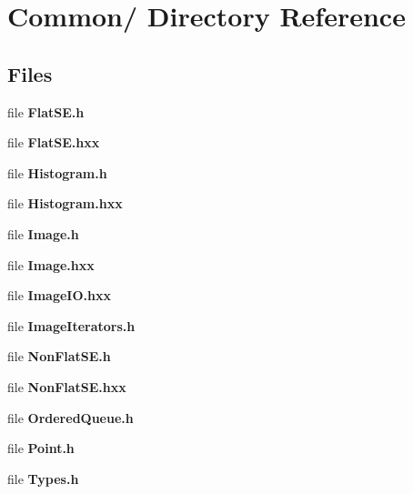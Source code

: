 \section{Common/ Directory Reference}
\label{dir_000001}
\subsection*{Files}
\begin{CompactItemize}
\item 
file {\bf Flat\-SE.h}
\item 
file {\bf Flat\-SE.hxx}
\item 
file {\bf Histogram.h}
\item 
file {\bf Histogram.hxx}
\item 
file {\bf Image.h}
\item 
file {\bf Image.hxx}
\item 
file {\bf Image\-IO.hxx}
\item 
file {\bf Image\-Iterators.h}
\item 
file {\bf Non\-Flat\-SE.h}
\item 
file {\bf Non\-Flat\-SE.hxx}
\item 
file {\bf Ordered\-Queue.h}
\item 
file {\bf Point.h}
\item 
file {\bf Types.h}
\end{CompactItemize}
